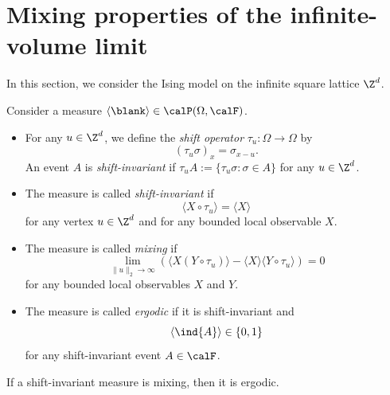 \section{Mixing properties of the infinite-volume limit}

In this section, we consider the Ising model on the infinite square lattice $\Z^d$.

\begin{definition}
    Consider a measure $\langle\blank\rangle\in\calP(\Omega,\calF)$.
    \begin{itemize}
        \item For any $u\in\Z^d$, we define the \emph{shift operator} $\tau_u:\Omega\to\Omega$ by
            \[
                (\tau_u\sigma)_x = \sigma_{x-u}.
            \]
            An event $A$ is \emph{shift-invariant} if $\tau_uA:=\{\tau_u\sigma:\sigma\in
            A\}$ for any $u\in\Z^d$.
        \item The measure is called \emph{shift-invariant} if
            \[
                \langle X\circ\tau_u \rangle = \langle X\rangle
            \]
            for any vertex $u\in\Z^d$ and
            for any bounded local observable $X$.
        \item The measure is called \emph{mixing} if
            \[
                \lim_{\|u\|_2\to\infty}
                \left(\langle X(Y\circ\tau_u)\rangle-\langle X\rangle\langle
                Y\circ\tau_u\rangle\right)
                =0
            \]
            for any bounded local observables $X$ and $Y$.
        \item The measure is called \emph{ergodic}
            if it is shift-invariant
            and
            \[\langle\ind{A}\rangle\in\{0,1\}\]
            for any shift-invariant event $A\in\calF$.
    \end{itemize}
\end{definition}

\begin{lemma}
    If a shift-invariant measure is mixing, then it is ergodic.
\end{lemma}

